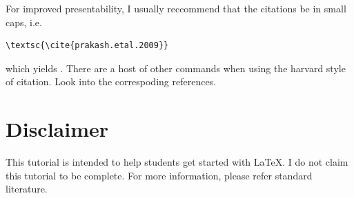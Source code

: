 \documentclass[a4paper,12pt,times]{article} %
\begin{document}
For improved presentability, I usually reccommend that the citations be in small caps, i.e.
\begin{verbatim}
\textsc{\cite{prakash.etal.2009}}
\end{verbatim}
which yields \textsc{\cite{prakash.etal.2009}}. There are a host of other commands when using the harvard style of citation. Look into the correspoding references.

\section{Disclaimer}
This tutorial is intended to help students get started with \LaTeX. I do not claim this tutorial to be complete. For more information, please refer standard literature.


\end{document}
